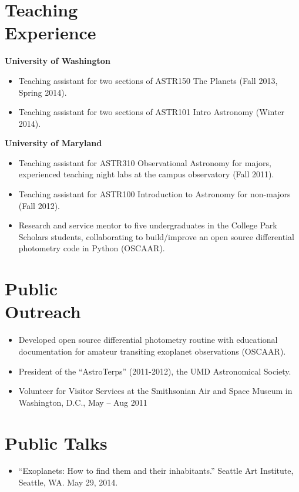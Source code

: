 \documentclass[margin]{res}
\begin{document}
\begin{resume}
\section{Teaching \\Experience}
\textbf{University of Washington}
\begin{itemize}   
\item Teaching assistant for two sections of ASTR150 The Planets (Fall 2013, Spring 2014).

\item Teaching assistant for two sections of ASTR101 Intro Astronomy (Winter 2014). 
\end{itemize}

\textbf{University of Maryland}
\begin{itemize}   
\item Teaching assistant for ASTR310 Observational Astronomy for majors, experienced teaching night labs at the campus observatory (Fall 2011).

\item Teaching assistant for ASTR100 Introduction to Astronomy for non-majors (Fall 2012).

\item Research and service mentor to five undergraduates in the College Park Scholars students, collaborating to build/improve an open source differential photometry code in Python (OSCAAR). \\
\end{itemize}



\section{Public \\ Outreach}             
\begin{itemize}   
\item Developed open source differential photometry routine with educational documentation for amateur transiting exoplanet observations (OSCAAR).

\item President of the ``AstroTerps'' (2011-2012), the UMD Astronomical Society.

\item Volunteer for Visitor Services at the Smithsonian Air and Space Museum in Washington, D.C., May -- Aug 2011
\end{itemize}


\section{Public Talks}
\begin{itemize}
\item ``Exoplanets: How to find them and their inhabitants.'' Seattle Art Institute, Seattle, WA. May 29, 2014.


\end{itemize}
\end{resume}
\end{document}
